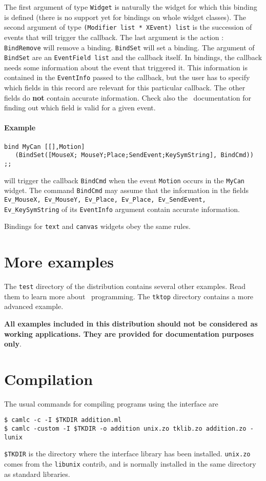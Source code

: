 The first argument of type \verb|Widget| is naturally the widget for which
this binding is defined (there is no support yet for bindings on whole
widget classes).
The second argument of type \verb|(Modifier list * XEvent) list| is the 
succession of events that will trigger the callback.
The last argument is the action : \verb|BindRemove| will remove a binding.
\verb|BindSet| will set a binding.
The argument of \verb|BindSet| are an \verb|EventField list| and the
callback itself. 
In bindings, the callback needs some information about the event that
triggered it. This information is contained in the \verb|EventInfo| passed
to the callback, but the user has to specify which fields in this record are
relevant for this particular callback. The other fields do {\bf not} contain
accurate information. Check also the \tk\ documentation for finding out
which field is valid for a given event.

\paragraph{Example}
\begin{verbatim}
bind MyCan [[],Motion] 
   (BindSet([MouseX; MouseY;Place;SendEvent;KeySymString], BindCmd)) ;;
\end{verbatim} 
will trigger the callback \verb|BindCmd| when the event \verb|Motion| occurs
in the \verb|MyCan| widget. The command \verb|BindCmd| may assume that the 
information in the fields {\tt Ev\_MouseX, Ev\_MouseY, Ev\_Place, Ev\_Place,
Ev\_SendEvent, Ev\_KeySymString} of its \verb|EventInfo| argument contain
accurate information.

Bindings for \verb|text| and \verb|canvas| widgets obey the same rules.


\section{More examples}
The \verb|test| directory of the distribution contains several other
examples. Read them to learn more about \caml\tk\ programming.
The \verb|tktop| directory contains a more advanced example. 

{\bf All examples included in this distribution  should not be considered as
working applications. They are provided for documentation purposes only}.

\section{Compilation}
The usual commands for compiling programs using the \caml\tk interface are
\begin{verbatim}
$ camlc -c -I $TKDIR addition.ml
$ camlc -custom -I $TKDIR -o addition unix.zo tklib.zo addition.zo -lunix
\end{verbatim} 
\verb|$TKDIR| is the directory where the interface library has been
installed. \verb|unix.zo| comes from the \verb|libunix| contrib, and is
normally installed in the same directory as standard \caml libraries.

